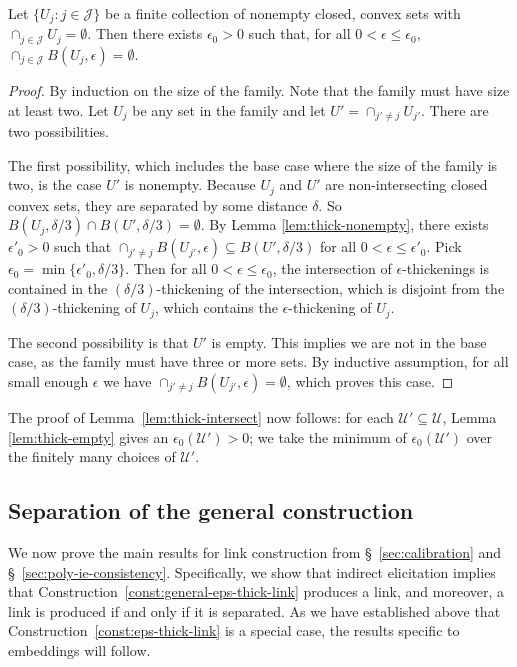 \documentclass[twoside,11pt]{article}
\newcommand{\U}{\mathcal{U}}
\begin{document}
\begin{lemma} \label{lem:thick-empty}
  Let $\{U_j : j \in \mathcal{J}\}$ be a finite collection of nonempty closed, convex sets with $\cap_{j\in\mathcal{J}} U_j = \emptyset$.
  Then there exists  $\epsilon_0 > 0$ such that, for all $0 < \epsilon \leq \epsilon_0$, $\cap_{j\in\mathcal{J}} B(U_j,\epsilon) = \emptyset$.
\end{lemma}
\begin{proof}
  By induction on the size of the family.
  Note that the family must have size at least two.
  Let $U_j$ be any set in the family and let $U' = \cap_{j' \neq j} U_{j'}$.
  There are two possibilities.

  The first possibility, which includes the base case where the size of the family is two, is the case $U'$ is nonempty.
  Because $U_j$ and $U'$ are non-intersecting closed convex sets, they are separated by some distance $\delta$.
  So $B(U_j, \delta/3) \cap B(U', \delta/3) = \emptyset$.
  By Lemma \ref{lem:thick-nonempty}, there exists $\epsilon'_0 > 0$ such that $\cap_{j'\neq j} B(U_{j'},\epsilon) \subseteq B(U', \delta/3)$ for all $0 < \epsilon \leq \epsilon'_0$.
  Pick $\epsilon_0 = \min\{\epsilon'_0,\delta/3\}$.
  Then for all $0 < \epsilon \leq \epsilon_0$, the intersection of $\epsilon$-thickenings is contained in the $(\delta/3)$-thickening of the intersection, which is disjoint from the $(\delta/3)$-thickening of $U_j$, which contains the $\epsilon$-thickening of $U_j$.

  The second possibility is that $U'$ is empty.
  This implies we are not in the base case, as the family must have three or more sets.
  By inductive assumption, for all small enough $\epsilon$ we have $\cap_{j' \neq j} B(U_{j'},\epsilon) = \emptyset$, which proves this case.
\end{proof}

The proof of Lemma~\ref{lem:thick-intersect} now follows: for each $\U'\subseteq\U$, Lemma \ref{lem:thick-empty} gives an $\epsilon_0(\U') > 0$; we take the minimum of $\epsilon_0(\U')$ over the finitely many choices of $\U'$.

\subsection{Separation of the general construction}

We now prove the main results for link construction from \S~\ref{sec:calibration} and \S~\ref{sec:poly-ie-consistency}.
Specifically, we show that indirect elicitation implies that Construction~\ref{const:general-eps-thick-link} produces a link, and moreover, a link is produced if and only if it is separated.
As we have established above that Construction~\ref{const:eps-thick-link} is a special case, the results specific to embeddings will follow.
\end{document}
